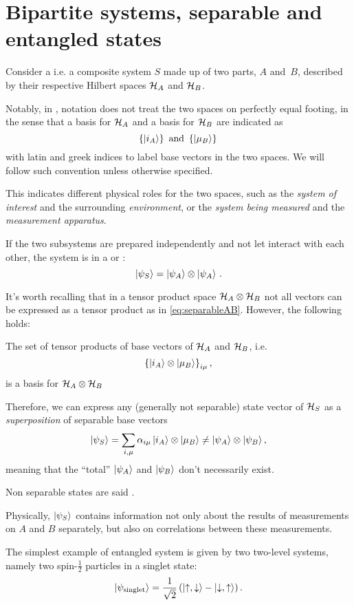 \section{Bipartite systems, separable and entangled states}

Consider a 
i.e. a composite system $S$
made up of two parts, $A$ and~$B$,
described by their respective Hilbert spaces
$\mathcal{H}_A$ and $\mathcal{H}_B$.

Notably, in \cite{Haroche_Exploring},
notation does not treat the two spaces
on perfectly equal footing,
in the sense that a basis for $\mathcal{H}_A$ and a basis for $\mathcal{H}_B$
are indicated as
$$
  \left\{\ket{i_A}\right\} \text{ and } \left\{\ket{\mu_B}\right\}\,
$$
with latin and greek indices to label base vectors in the two spaces.
We will follow such convention unless otherwise specified.

This indicates different physical roles for the two spaces,
such as the \emph{system of interest} and the surrounding \emph{environment},
or the \emph{system being measured} and the \emph{measurement apparatus}.

If the two subsystems are prepared independently and not let interact with each other,
the system is in a  or :
\begin{equation}\label{eq:separableAB}
  \ket{\psi_S} = \ket{\psi_A}\otimes\ket{\psi_A} \,\text{.}
\end{equation}

It's worth recalling that in a tensor product space $\mathcal{H}_A\otimes\mathcal{H}_B$
not all vectors can be expressed as a tensor product as in \eqref{eq:separableAB}.
However, the following holds:

\begin{proposition}\label{TensorBase}
The set of tensor products of base vectors of $\mathcal{H}_A$ and $\mathcal{H}_B$,
i.e. $$\left\{\ket{i_A} \otimes \ket{\mu_B}\right\}_{i\mu},$$
is a basis for $\mathcal{H}_A \otimes \mathcal{H}_B$
\end{proposition}
Therefore, we can express any
(generally not separable) state vector of $\mathcal{H}_S$
as a \emph{superposition} of separable base vectors
\begin{equation}\label{eq:bipartite_expansion}
  \ket{\psi_S} = \sum_{i, \mu}\alpha_{i\mu}\ket{i_A}\otimes\ket{\mu_B} \neq \ket{\psi_A}\otimes\ket{\psi_B},
\end{equation}
meaning that the
``total'' $\ket{\psi_A}$ and $\ket{\psi_B}$ don't necessarily exist.

Non separable states are said .

Physically,
$\ket{\psi_S}$ contains information
not only about the results of measurements on $A$ and $B$ separately,
but also on correlations between these measurements.

The simplest example of entangled system is given by two two-level systems,
namely two spin-$\frac{1}{2}$ particles in a singlet state:
\[
  \ket{\psi_{\text{singlet}}} = \frac{1}{\sqrt{2}} \left(\ket{\uparrow, \downarrow} - \ket{\downarrow, \uparrow}\right).
\]
